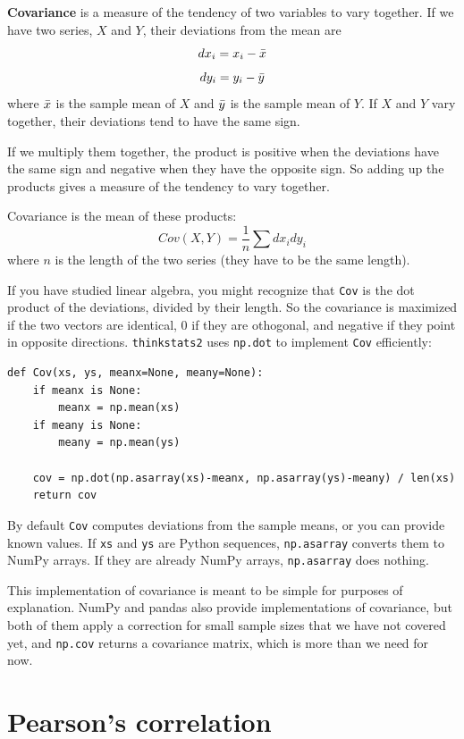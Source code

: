 \documentclass[12pt]{book}
\begin{document}
{\bf Covariance} is a measure of the tendency of two variables
to vary together.  If we have two series, $X$ and $Y$, their
deviations from the mean are
%
\[ dx_i = x_i - \bar{x} \]
%
\[ dy_i = y_i - \bar{y} \]
%
where $\bar{x}$ is the sample mean of $X$ and $\bar{y}$ is the sample mean
of $Y$.  If $X$ and $Y$ vary together, their deviations tend to have
the same sign.

If we multiply them together, the product is positive when the
deviations have the same sign and negative when they have the opposite
sign.  So adding up the products gives a measure of the tendency to
vary together.

Covariance is the mean of these products:
%
\[ Cov(X,Y) = \frac{1}{n} \sum dx_i dy_i \]
%
where $n$ is the length of the two series (they have to be the same
length).

If you have studied linear algebra, you might recognize that
{\tt Cov} is the dot product of the deviations, divided
by their length.  So the covariance is maximized if the two vectors
are identical, 0 if they are othogonal, and negative if they
point in opposite directions.  {\tt thinkstats2} uses {\tt np.dot} to
implement {\tt Cov} efficiently:

\begin{verbatim}
def Cov(xs, ys, meanx=None, meany=None):
    if meanx is None:
        meanx = np.mean(xs)
    if meany is None:
        meany = np.mean(ys)

    cov = np.dot(np.asarray(xs)-meanx, np.asarray(ys)-meany) / len(xs)
    return cov
\end{verbatim}

By default {\tt Cov} computes deviations from the sample means,
or you can provide known values.  If {\tt xs} and {\tt ys} are
Python sequences, {\tt np.asarray} converts them to NumPy arrays.
If they are already NumPy arrays, {\tt np.asarray} does nothing.

This implementation of covariance is meant to be simple for purposes
of explanation.  NumPy and pandas also provide implementations of
covariance, but both of them apply a correction for small sample sizes
that we have not covered yet, and {\tt np.cov} returns a covariance
matrix, which is more than we need for now.


\section{Pearson's correlation}
\end{document}
